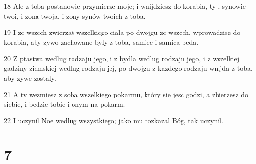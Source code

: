 \par 18 Ale z toba postanowie przymierze moje; i wnijdziesz do korabia, ty i synowie twoi, i zona twoja, i zony synów twoich z toba.
\par 19 I ze wszech zwierzat wszelkiego ciala po dwojgu ze wszech, wprowadzisz do korabia, aby zywo zachowane byly z toba, samiec i samica beda.
\par 20 Z ptastwa wedlug rodzaju jego, i z bydla wedlug rodzaju jego, i z wszelkiej gadziny ziemskiej wedlug rodzaju jej, po dwojgu z kazdego rodzaju wnijda z toba, aby zywe zostaly.
\par 21 A ty wezmiesz z soba wszelkiego pokarmu, który sie jesc godzi, a zbierzesz do siebie, i bedzie tobie i onym na pokarm.
\par 22 I uczynil Noe wedlug wszystkiego; jako mu rozkazal Bóg, tak uczynil.

\chapter{7}

